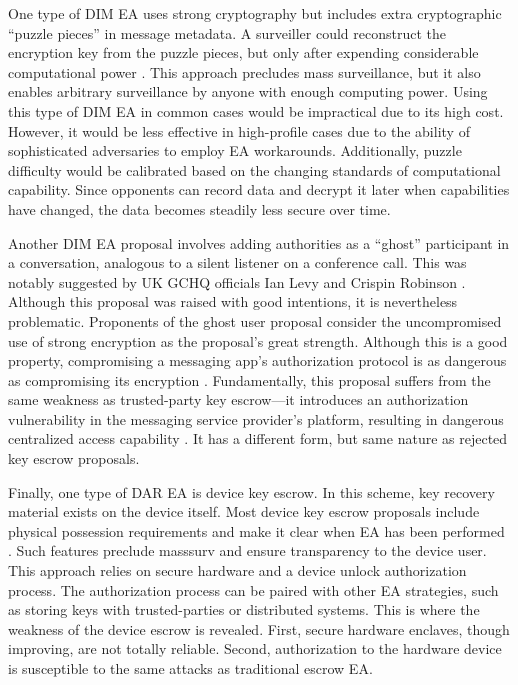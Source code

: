 \documentclass{IEEEtran}
\begin{document}
One type of \ac{DIM} \ac{EA} uses strong cryptography but includes extra cryptographic ``puzzle pieces'' in message
metadata. A surveiller could reconstruct the encryption key from the puzzle pieces, but only after expending
considerable computational power \cite{bellare_translucent_1996} \cite{wright_crypto_2018}. This approach precludes mass
surveillance, but it also enables arbitrary surveillance by anyone with enough computing power. Using this type of
\ac{DIM} \ac{EA} in common cases would be impractical due to its high cost. However, it would be less effective in
high-profile cases due to the ability of sophisticated adversaries to employ \ac{EA} workarounds. Additionally, puzzle
difficulty would be calibrated based on the changing standards of computational capability. Since opponents can record
data and decrypt it later when capabilities have changed, the data becomes steadily less secure over time.

Another \ac{DIM} \ac{EA} proposal involves adding authorities as a ``ghost'' participant in a conversation, analogous to
a silent listener on a conference call. This was notably suggested by UK \ac{GCHQ} officials Ian Levy and Crispin
Robinson \cite{levy_robinson_2018}. Although this proposal was raised with good intentions, it is nevertheless problematic. Proponents of the ghost user
proposal consider the uncompromised use of strong encryption as the proposal's great strength. Although this is a good
property, compromising a messaging app's authorization protocol is as dangerous as compromising its encryption
\cite{callas_1_2019}. Fundamentally, this proposal suffers from the same weakness as trusted-party key escrow---it
introduces an authorization vulnerability in the messaging service provider's platform, resulting in dangerous
centralized access capability \cite{schneier_ghost_2019}. It has a different form, but same nature as rejected key
escrow proposals.

Finally, one type of \ac{DAR} \ac{EA} is device key escrow. In this scheme, key recovery material exists on the device
itself. Most device key escrow proposals include physical possession requirements and make it clear when \ac{EA} has
been performed \cite{savage_lawful_2018} \cite{ozzie_2018}. Such features preclude \ac{masssurv} and ensure transparency
to the device user. This approach relies on secure hardware and a device unlock authorization process. The authorization
process can be paired with other \ac{EA} strategies, such as storing keys with trusted-parties or distributed systems.
This is where the weakness of the device escrow is revealed. First, secure hardware enclaves, though improving, are not
totally reliable. Second, authorization to the hardware device is susceptible to the same attacks as traditional escrow
\ac{EA}.
\end{document}
